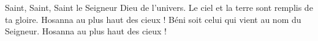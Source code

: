 Saint, Saint, Saint le Seigneur Dieu de l’univers.
Le ciel et la terre sont remplis de ta gloire. Hosanna au plus haut des cieux !
Béni soit celui qui vient au nom du Seigneur. Hosanna au plus haut des cieux !

